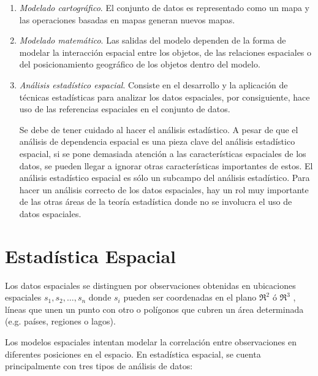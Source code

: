 \begin{enumerate}
\item \textit{Modelado cartográfico}. El conjunto de datos es representado como un mapa y las operaciones basadas en mapas generan nuevos mapas.

\item \textit{Modelado matemático}. Las salidas del modelo dependen de la forma de modelar la interacción espacial entre los objetos, de las relaciones espaciales o del posicionamiento geográfico de los objetos dentro del modelo.

\item \textit{Análisis estadístico espacial}. Consiste en el desarrollo y la aplicación de técnicas estadísticas para analizar los datos espaciales, por consiguiente, hace uso de las referencias espaciales en el conjunto de datos.

Se debe de tener cuidado al hacer el análisis estadístico. A pesar de que el análisis de dependencia espacial es una pieza clave del análisis estadístico espacial, si se pone demasiada atención a las características espaciales de los datos, se pueden llegar a ignorar otras características importantes de estos. El análisis estadístico espacial es sólo un subcampo del análisis estadístico. Para hacer un análisis correcto de los datos espaciales, hay un rol muy importante de las otras áreas de la teoría estadística donde no se involucra el uso de datos espaciales.

\end{enumerate}

\section{Estadística Espacial}
Los datos espaciales se distinguen por observaciones obtenidas en ubicaciones espaciales $s_1,s_2,\dots,s_n$ donde $s_i$ pueden ser coordenadas en el plano $\Re^2$ ó $\Re^3$ , líneas que unen un punto con otro o polígonos que cubren un área determinada (e.g. países, regiones o lagos).

Los modelos espaciales intentan modelar la correlación entre observaciones en diferentes posiciones en el espacio.
En estadística espacial, se cuenta principalmente con tres tipos de análisis de datos:


